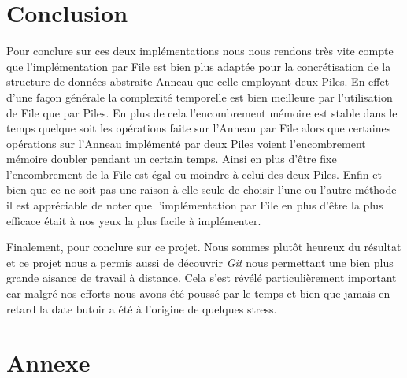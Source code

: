 \documentclass{article}
\begin{document}
\section{Conclusion}

Pour conclure sur ces deux implémentations nous nous rendons très vite compte que l'implémentation par File est bien plus adaptée pour la concrétisation de la structure de données abstraite Anneau que celle employant deux Piles. En effet d'une façon générale la complexité temporelle est bien meilleure par l'utilisation de File que par Piles. En plus de cela l'encombrement mémoire est stable dans le temps quelque soit les opérations faite sur l'Anneau par File alors que certaines opérations sur l'Anneau implémenté par deux Piles voient l'encombrement mémoire doubler pendant un certain temps. Ainsi en plus d'être fixe l'encombrement de la File est égal ou moindre à celui des deux Piles. Enfin et bien que ce ne soit pas une raison à elle seule de choisir l'une ou l'autre méthode il est appréciable de noter que l'implémentation par File en plus d'être la plus efficace était à nos yeux la plus facile à implémenter.

Finalement, pour conclure sur ce projet. Nous sommes plutôt heureux du résultat et ce projet nous a permis aussi de découvrir \emph{Git} nous permettant une bien plus grande aisance de travail à distance. Cela s'est révélé particulièrement important car malgré nos efforts nous avons été poussé par le temps et bien que jamais en retard la date butoir a été à l'origine de quelques stress.

\newpage
\appendix
\section*{Annexe}


\newpage
\tableofcontents
\end{document}
